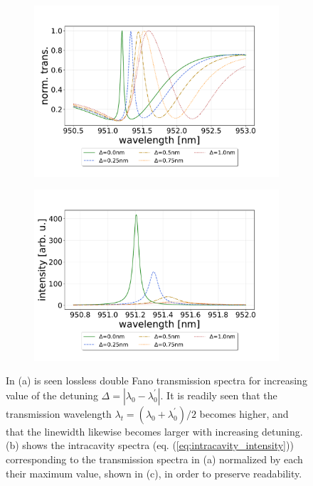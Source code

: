 \begin{figure}[h!]
    \centering
    \begin{subfigure}[b]{0.49\textwidth}
        \includegraphics[width=\textwidth]{figures/detuning_scan_double_fano_30um.pdf}
        \caption{}
        \label{fig:detuning_scan}
    \end{subfigure}
    \begin{subfigure}[b]{0.49\textwidth}
        \includegraphics[width=\textwidth]{figures/detuning_scan_double_fano_30um_intracavity.pdf}
        \caption{}
        \label{fig:detuning_scan_intracavity}
    \end{subfigure}
    \caption{In (a) is seen lossless double Fano transmission spectra for increasing value of the detuning $\Delta = |\lambda_{0} - \lambda_{0}^{\prime}|$. It is readily seen that the transmission wavelength $\lambda_t = (\lambda_{0} + \lambda_{0}^{\prime})/2$ becomes higher, and that the linewidth likewise becomes larger with increasing detuning. (b) shows the intracavity spectra (eq. (\ref{eq:intracavity_intensity})) corresponding to the transmission spectra in (a) normalized by each their maximum value, shown in (c), in order to preserve readability.}
    \label{fig:detuning_scans}
\end{figure}


